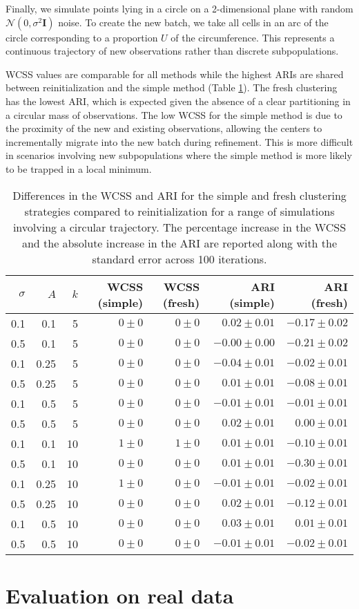 \documentclass{article}
\begin{document}
Finally, we simulate points lying in a circle on a 2-dimensional plane with random $\mathcal{N}(0, \sigma^2\mathbf{I})$ noise.
To create the new batch, we take all cells in an arc of the circle corresponding to a proportion $U$ of the circumference.
This represents a continuous trajectory of new observations rather than discrete subpopulations.

WCSS values are comparable for all methods while the highest ARIs are shared between reinitialization and the simple method (Table \ref{tab:circular}).
The fresh clustering has the lowest ARI, which is expected given the absence of a clear partitioning in a circular mass of observations.
The low WCSS for the simple method is due to the proximity of the new and existing observations,
allowing the centers to incrementally migrate into the new batch during refinement.
This is more difficult in scenarios involving new subpopulations where the simple method is more likely to be trapped in a local minimum.

\begin{table}
\caption{Differences in the WCSS and ARI for the simple and fresh clustering strategies compared to reinitialization for a range of simulations involving a circular trajectory.
The percentage increase in the WCSS and the absolute increase in the ARI are reported along with the standard error across 100 iterations.}
\label{tab:circular}
\begin{center}
\begin{tabular}{r r r r r r r}
\hline
$\sigma$ & $A$ & $k$ & WCSS (simple) & WCSS (fresh) & ARI (simple) & ARI (fresh) \\
\hline
0.1 & 0.1 & 5 & $0 \pm 0$ & $0 \pm 0$ & $0.02 \pm 0.01$ & $-0.17 \pm 0.02$ \\
0.5 & 0.1 & 5 & $0 \pm 0$ & $0 \pm 0$ & $-0.00 \pm 0.00$ & $-0.21 \pm 0.02$ \\
0.1 & 0.25 & 5 & $0 \pm 0$ & $0 \pm 0$ & $-0.04 \pm 0.01$ & $-0.02 \pm 0.01$ \\
0.5 & 0.25 & 5 & $0 \pm 0$ & $0 \pm 0$ & $0.01 \pm 0.01$ & $-0.08 \pm 0.01$ \\
0.1 & 0.5 & 5 & $0 \pm 0$ & $0 \pm 0$ & $-0.01 \pm 0.01$ & $-0.01 \pm 0.01$ \\
0.5 & 0.5 & 5 & $0 \pm 0$ & $0 \pm 0$ & $0.02 \pm 0.01$ & $0.00 \pm 0.01$ \\
0.1 & 0.1 & 10 & $1 \pm 0$ & $1 \pm 0$ & $0.01 \pm 0.01$ & $-0.10 \pm 0.01$ \\
0.5 & 0.1 & 10 & $0 \pm 0$ & $0 \pm 0$ & $0.01 \pm 0.01$ & $-0.30 \pm 0.01$ \\
0.1 & 0.25 & 10 & $1 \pm 0$ & $0 \pm 0$ & $-0.01 \pm 0.01$ & $-0.02 \pm 0.01$ \\
0.5 & 0.25 & 10 & $0 \pm 0$ & $0 \pm 0$ & $0.02 \pm 0.01$ & $-0.12 \pm 0.01$ \\
0.1 & 0.5 & 10 & $0 \pm 0$ & $0 \pm 0$ & $0.03 \pm 0.01$ & $0.01 \pm 0.01$ \\
0.5 & 0.5 & 10 & $0 \pm 0$ & $0 \pm 0$ & $-0.01 \pm 0.01$ & $-0.02 \pm 0.01$ \\
\hline
\end{tabular}
\end{center}
\end{table}

\section{Evaluation on real data}



\end{document}
